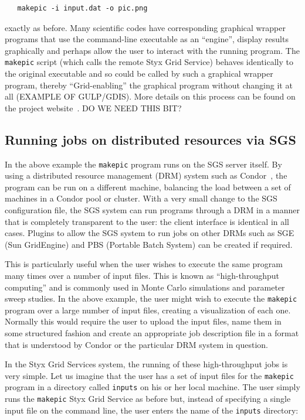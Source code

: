 \documentclass[a4paper]{article}
\begin{document}
\begin{verbatim}
   makepic -i input.dat -o pic.png
\end{verbatim}
exactly as before.  Many scientific codes have corresponding graphical wrapper programs that use the command-line executable as an ``engine'', display results graphically and perhaps allow the user to interact with the running program.  The \texttt{makepic} script (which calls the remote Styx Grid Service) behaves identically to the original executable and so could be called by such a graphical wrapper program, thereby ``Grid-enabling'' the graphical program without changing it at all (EXAMPLE OF GULP/GDIS).  More details on this process can be found on the project website~\cite{sgswebsite}.  DO WE NEED THIS BIT?

\subsection{Running jobs on distributed resources via SGS}\label{sec:condor_sge}
In the above example the \texttt{makepic} program runs on the SGS server itself.  By using a distributed resource management (DRM) system such as Condor~\cite{condor}, the program can be run on a different machine, balancing the load between a set of machines in a Condor pool or cluster.  With a very small change to the SGS configuration file, the SGS system can run programs through a DRM in a manner that is completely transparent to the user: the client interface is identical in all cases.  Plugins to allow the SGS system to run jobs on other DRMs such as SGE (Sun GridEngine) and PBS (Portable Batch System) can be created if required.

This is particularly useful when the user wishes to execute the same program many times over a number of input files.  This is known as ``high-throughput computing'' and is commonly used in Monte Carlo simulations and parameter sweep studies.  In the above example, the user might wish to execute the \texttt{makepic} program over a large number of input files, creating a visualization of each one.  Normally this would require the user to upload the input files, name them in some structured fashion and create an appropriate job description file in a format that is understood by Condor or the particular DRM system in question.

In the Styx Grid Services system, the running of these high-throughput jobs is very simple.  Let us imagine that the user has a set of input files for the \texttt{makepic} program in a directory called \texttt{inputs} on his or her local machine.  The user simply runs the \texttt{makepic} Styx Grid Service as before but, instead of specifying a single input file on the command line, the user enters the name of the \texttt{inputs} directory:
\end{document}
